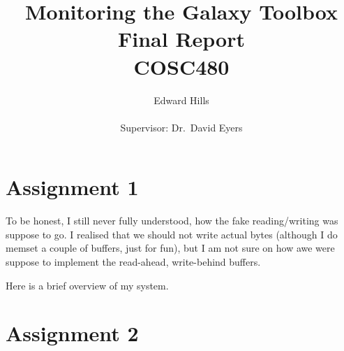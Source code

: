 \documentclass[12pt]{article}
\title{Monitoring the Galaxy Toolbox \\ Final Report \\ COSC480}
\author{Edward Hills \\ \\ Supervisor: Dr.\ David Eyers}
\begin{document}
\vspace{-1cm}

\maketitle

\section{Assignment 1}

To be honest, I still never fully understood, how the fake reading/writing was suppose to go. I realised that we should not write actual bytes (although I do memset a couple of buffers, just for fun), but I am not sure on how awe were suppose to implement the read-ahead, write-behind buffers.

Here is a brief overview of my system.

\section{Assignment 2}
\end{document}
